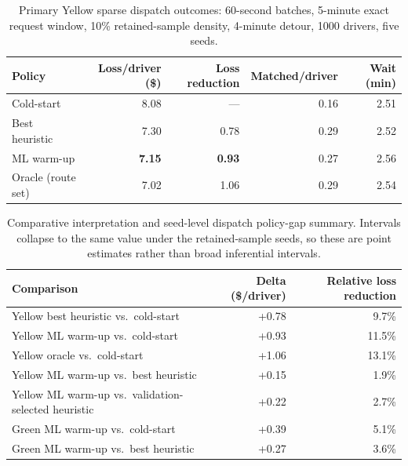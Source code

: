 \documentclass[journal]{IEEEtran}
\begin{document}
\begin{table}[!t]
\caption{Primary Yellow sparse dispatch outcomes: 60-second batches, 5-minute exact request window, 10\% retained-sample density, 4-minute detour, 1000 drivers, five seeds.}
\label{tab:dispatch_primary}
\centering
\scriptsize
\setlength{\tabcolsep}{2.6pt}
\begin{tabular}{|l|r|r|r|r|}
\hline
Policy & Loss/driver (\$) & Loss reduction & Matched/driver & Wait (min) \\
\hline
Cold-start & 8.08 & --- & 0.16 & 2.51 \\
\hline
Best heuristic & 7.30 & 0.78 & 0.29 & 2.52 \\
\hline
ML warm-up & \textbf{7.15} & \textbf{0.93} & 0.27 & 2.56 \\
\hline
Oracle (route set) & 7.02 & 1.06 & 0.29 & 2.54 \\
\hline
\end{tabular}
\end{table}

\begin{table}[!t]
\caption{Comparative interpretation and seed-level dispatch policy-gap summary. Intervals collapse to the same value under the retained-sample seeds, so these are point estimates rather than broad inferential intervals.}
\label{tab:dispatch_delta}
\label{tab:dispatch_policy_gap}
\centering
\footnotesize
\begin{tabularx}{\columnwidth}{|Y|r|r|}
\hline
Comparison & Delta (\$/driver) & Relative loss reduction \\
\hline
Yellow best heuristic vs.\ cold-start & +0.78 & 9.7\% \\
\hline
Yellow ML warm-up vs.\ cold-start & +0.93 & 11.5\% \\
\hline
Yellow oracle vs.\ cold-start & +1.06 & 13.1\% \\
\hline
Yellow ML warm-up vs.\ best heuristic & +0.15 & 1.9\% \\
\hline
Yellow ML warm-up vs.\ validation-selected heuristic & +0.22 & 2.7\% \\
\hline
Green ML warm-up vs.\ cold-start & +0.39 & 5.1\% \\
\hline
Green ML warm-up vs.\ best heuristic & +0.27 & 3.6\% \\
\hline
\end{tabularx}
\end{table}
\end{document}
